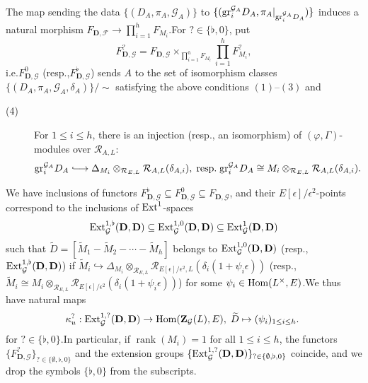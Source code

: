 \documentclass[10pt]{article}
\newcommand{\hooklongrightarrow}{\lhook\joinrel\longrightarrow}
\DeclareMathOperator{\rank}{rank}
\newcommand{\homo}{{\rm Hom}}
\newcommand{\ext}{{\rm Ext}}
\newcommand{\gr}{{\rm gr}}
\newcommand{\Dpik}{{\mathbf{D}}}
\newcommand{\bZ}{{\mathbf{Z}}}
\newcommand{\cR}{\mathcal R}
\newcommand{\cF}{\mathcal F}
\newcommand{\cG}{\mathcal G}
\begin{document}
The map sending the data $\{(D_A,\pi_A,\cG_A)\}$ to $\{(\gr^{\cG_A}_iD_A,\pi_A|_{\gr_i^{\cG_A}D_A})\}$ induces a natural morphism $F_{\Dpik,\cF}\longrightarrow \prod_{i=1}^hF_{M_i}$.\;For $?\in\{\flat,0\}$, put
\[F_{\Dpik,\cG}^{?}=F_{\Dpik,\cG}\times_{\prod_{i=1}^h F_{M_i}}\prod_{i=1}^h F_{M_i}^{?},\]
i.e.\;$F_{\Dpik,\cG}^0$ (resp.,\;$F_{\Dpik,\cG}^{\flat}$) sends $A$ to the set of isomorphism classes $\{(D_A,\pi_A,\cG_A,\delta_A)\}/\sim$ satisfying the above conditions $(1)$--$(3)$ and
\begin{description}
	\item[(4)] For $1\leq i\leq h$, there is an injection (resp., an isomorphism) of $(\varphi,\Gamma)$-modules over $\cR_{A,L}$:
	\begin{equation}\label{injectiondefF0deforma}
		\gr^{\cG_A}_iD_A\hooklongrightarrow \Delta_{M_i}\otimes_{\cR_{E,L}}\cR_{A,L}({\delta}_{A,i}),\;\text{resp.\;}\gr^{\cG_A}_iD_A\cong M_{i}\otimes_{\cR_{E,L}}\cR_{A,L}({\delta}_{A,i}).\;
	\end{equation}
\end{description}
We have inclusions of functors $F_{\Dpik,\cG}^{\flat}\subseteq F_{\Dpik,\cG}^{0}\subseteq F_{\Dpik,\cG}$, and their $E[\epsilon]/\epsilon^2$-points correspond to the inclusions of $\ext^1$-spaces
\[\ext^{1,\flat}_{\cG}(\Dpik,\Dpik)\subseteq \ext^{1,0}_{\cG}(\Dpik,\Dpik)\subseteq \ext^1_{\cG}(\Dpik,\Dpik)\] 
such that $\widetilde{D}=[\widetilde{M}_{1}-\widetilde{M}_{2}-\cdots-\widetilde{M}_{h}]$ belongs to $\ext^{1,0}_{\cG}(\Dpik,\Dpik)$ (resp.,\;$\ext^{1,\flat}_{\cG}(\Dpik,\Dpik)$) if $\widetilde{M}_{i}\hookrightarrow  \Delta_{M_i}\otimes_{\cR_{E,L}}\cR_{E[\epsilon]/\epsilon^2,L}(\delta_i(1+\psi_i\epsilon))$ (resp.,\;$\widetilde{M}_{i}\cong M_{i}\otimes_{\cR_{E,L}}\cR_{E[\epsilon]/\epsilon^2}(\delta_i(1+\psi_i\epsilon))$) for some $\psi_i\in \homo(L^{\times},E)$.\;We thus have natural maps
\begin{equation}
	\begin{aligned}
		\kappa^{?}_{u}:\ext^{1,?}_{\cG}(\Dpik,\Dpik)\rightarrow\homo(\bZ_{\cG}(L),E),\;\widetilde{D}\mapsto (\psi_i)_{1\leq i\leq h}.\;
	\end{aligned}
\end{equation}
for $?\in\{\flat,0\}$.\;In particular, if $\rank(M_i)=1$ for all $1\leq i\leq h$, the functors $\{F_{\Dpik,\cG}^{?}\}_{?\in\{\emptyset,\flat,0\}}$ and the extension groups $\{\ext^{1,?}_{\cG}(\Dpik,\Dpik)\}_{?\in\{\emptyset,\flat,0\}}$ coincide, and we drop the symbols $\{\flat,0\}$ from the subscripts.\;
\end{document}
